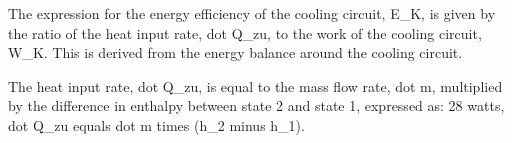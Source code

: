 The expression for the energy efficiency of the cooling circuit, E_K, is given by the ratio of the heat input rate, dot Q_zu, to the work of the cooling circuit, W_K. This is derived from the energy balance around the cooling circuit.

The heat input rate, dot Q_zu, is equal to the mass flow rate, dot m, multiplied by the difference in enthalpy between state 2 and state 1, expressed as:
28 watts, dot Q_zu equals dot m times (h_2 minus h_1).